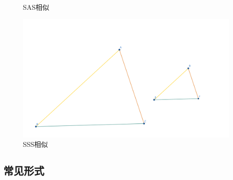 \begin{figure}[h]
\begin{minipage}[t]{0.3\textwidth}
    \caption{SAS相似}
    \end{minipage}
    \begin{minipage}[t]{0.3\textwidth}
    \centering
    \includegraphics[width=\linewidth]{figures/SSS相似.png}
    \caption{SSS相似}
    \end{minipage}
\end{figure}












\subsection{常见形式}

